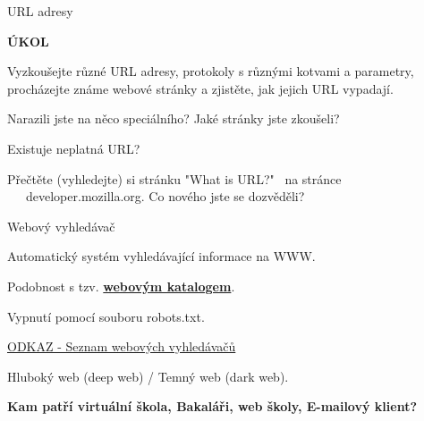 \documentclass[aspectratio=169]{beamer}
\begin{document}
\begin{frame}{URL adresy}
    \begin{cardTiny}
        \begin{center}
            \textbf{ÚKOL}
        \end{center}
        \begin{flushleft}
            Vyzkoušejte různé URL adresy, protokoly s různými kotvami a parametry, procházejte známe webové stránky a zjistěte, jak jejich URL vypadají.

            \vspace{2ex}            
            Narazili jste na něco speciálního? Jaké stránky jste zkoušeli?

            Existuje neplatná URL?

            Přečtěte (vyhledejte) si stránku "What is URL?"~ na stránce \\~~~developer.mozilla.org. Co nového jste se dozvěděli?
        \end{flushleft}
    \end{cardTiny}
\end{frame}

\begin{frame}{Webový vyhledávač}
    \begin{cardTiny}
        \begin{flushleft}
            Automatický systém vyhledávající informace na WWW.

            Podobnost s tzv. \href{https://odkazy.seznam.cz}{\textbf{webovým katalogem}}.

            Vypnutí pomocí souboru robots.txt.

            \href{https://en.wikipedia.org/wiki/List\_of\_search\_engines}{ODKAZ - Seznam webových vyhledávačů}

            Hluboký web (deep web) / Temný web (dark web).
        \end{flushleft}
    \end{cardTiny}
    \begin{cardTiny}
        \begin{center}
            \textbf{Kam patří virtuální škola, Bakaláři, web školy, E-mailový klient?}
        \end{center}
    \end{cardTiny}
\end{frame}
\end{document}
